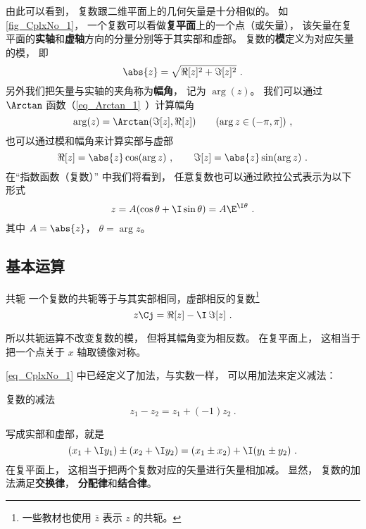 由此可以看到， 复数跟二维平面上的几何矢量是十分相似的。 如\autoref{fig_CplxNo_1}， 一个复数可以看做\textbf{复平面}上的一个点（或矢量）， 该矢量在复平面的\textbf{实轴}和\textbf{虚轴}方向的分量分别等于其实部和虚部。 复数的\textbf{模}定义为对应矢量的模， 即
\begin{equation}
\abs{z} = \sqrt{\Re[z]^2 + \Im[z]^2}~.
\end{equation}
另外我们把矢量与实轴的夹角称为\textbf{幅角}， 记为 $\arg(z)$。 我们可以通过 $\Arctan$ 函数（\autoref{eq_Arctan_1}~）计算幅角
\begin{equation}\label{eq_CplxNo_5}
\arg(z) = \Arctan(\Im[z], \Re[z])
\qquad (\arg z \in (-\pi, \pi])~,
\end{equation}
也可以通过模和幅角来计算实部与虚部
\begin{equation}
\Re[z] = \abs{z}\cos(\arg z)~, \qquad \Im[z] = \abs{z}\sin(\arg z)~.
\end{equation}
在“指数函数（复数）” 中我们将看到， 任意复数也可以通过欧拉公式表示为以下形式
\begin{equation}
z = A(\cos\theta + \I\sin\theta) = A\E^{\I\theta}~.
\end{equation}
其中 $A = \abs{z}$， $\theta = \arg z$。

\subsection{基本运算}
\begin{definition}{共轭}
一个复数的共轭等于与其实部相同，虚部相反的复数\footnote{一些教材也使用 $\bar z$ 表示 $z$ 的共轭。}
\begin{equation}\label{eq_CplxNo_6}
z\Cj = \Re[z] - \I\, \Im[z]~.
\end{equation}
\end{definition}
所以共轭运算不改变复数的模， 但将其幅角变为相反数。 在复平面上， 这相当于把一个点关于 $x$ 轴取镜像对称。

\autoref{eq_CplxNo_1} 中已经定义了加法，与实数一样， 可以用加法来定义减法：
\begin{definition}{复数的减法}
\begin{equation}
z_1 - z_2 = z_1 + (-1)z_2~.
\end{equation}
\end{definition}
写成实部和虚部，就是
\begin{equation}
(x_1 + \I y_1) \pm (x_2 + \I y_2) = (x_1 \pm x_2) + \I (y_1 \pm y_2)~.
\end{equation}
在复平面上， 这相当于把两个复数对应的矢量进行矢量相加减。 显然， 复数的加法满足\textbf{交换律}， \textbf{分配律}和\textbf{结合律}。

